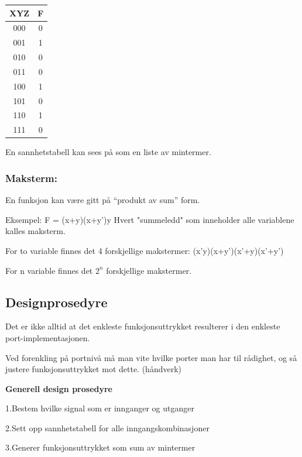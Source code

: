 \documentclass{article}
\begin{document}
	
	\begin{center}
		\begin{tabular}{|c|c|}
			\hline
			XYZ & F \\ \hline
			000 & 0  \\ \hline
			001 & \color{Aquamarine}1  \\ \hline 
			010 & 0  \\ \hline
			011 & 0  \\ \hline 
			100 & \color{BurntOrange}1  \\ \hline
			101 & 0  \\ \hline
			110 & \color{WildStrawberry}1  \\ \hline
			111 & 0  \\ \hline
			
		\end{tabular}
	\end{center}
	
	En sannhetstabell kan sees på som en liste av mintermer.
	
	\subsubsection*{Maksterm:}
	
	En funksjon kan være gitt på “produkt av sum” form.
	
	Eksempel: F = (x+y)(x+y')y 
	Hvert "summeledd" som inneholder alle variablene kalles maksterm.
	
	For to variable finnes det 4 forskjellige makstermer:
	(x'y)(x+y')(x'+y)(x'+y')
	
	For n variable finnes det $2^n$ forskjellige makstermer.
	
	\subsection*{Designprosedyre }
	
	Det er ikke alltid at det enkleste funksjonsuttrykket resulterer i den enkleste port-implementasjonen.
	
	Ved forenkling på portnivå må man vite hvilke porter man har til rådighet, og så justere funksjonsuttrykket mot dette. (håndverk) 
	
	\textbf{Generell design	prosedyre}
	
	1.Bestem hvilke signal som er innganger og 
	utganger
	
	2.Sett opp sannhetstabell for alle 
	inngangskombinasjoner
	
	3.Generer funksjonsuttrykket som sum av 
	mintermer 
	
\end{document}
